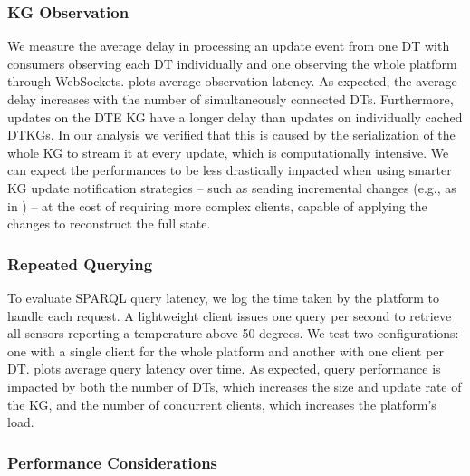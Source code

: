 \subsubsection{\acl{KG} Observation}

We measure the average delay in processing an update event from one \ac{DT} with consumers observing each \ac{DT} individually and one observing the whole platform through WebSockets.  plots average observation latency.
%
As expected, the average delay increases with the number of simultaneously connected DTs. Furthermore, updates on the \ac{DTE} \ac{KG} have a longer delay than updates on individually cached \acp{DTKG}. In our analysis we verified that this is caused by the serialization of the whole KG to stream it at every update, which is computationally intensive. 
%
We can expect the performances to be less drastically impacted when using smarter \ac{KG} update notification strategies -- such as sending incremental changes (e.g., as in \cite{roffia2018fi}) -- at the cost of requiring more complex clients, capable of applying the changes to reconstruct the full state.


\subsubsection{Repeated Querying}

To evaluate SPARQL query latency, we log the time taken by the platform to handle each request. A lightweight client issues one query per second to retrieve all sensors reporting a temperature above 50 degrees.
%
We test two configurations: one with a single client for the whole platform and another with one client per \ac{DT}.
%
 plots average query latency over time.
%
As expected, query performance is impacted by both the number of \acp{DT}, which increases the size and update rate of the \ac{KG}, and the number of concurrent clients, which increases the platform's load.

\subsubsection{Performance Considerations}

